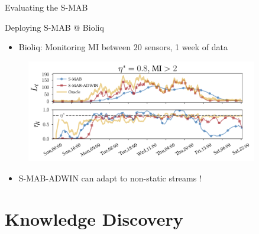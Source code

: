 \documentclass[16pt,usenames,dvipsnames, notheorems]{beamer}
\theoremstyle{definition}
\theoremstyle{example}
\theoremstyle{plain}
\begin{document}
\begin{frame}{Evaluating the S-MAB}
~\\

\end{frame}

\begin{frame}{Deploying S-MAB @ Bioliq}

\begin{itemize}
	\item Bioliq: Monitoring MI between $20$ sensors, 1 week of data
\end{itemize}
\begin{figure}
	\includegraphics[width=0.9\textwidth]{figures/Lt_etat_reduced_defense-compressed.pdf}
\end{figure}
\vspace{-0.5cm}
\begin{itemize}
	\item S-MAB-ADWIN can adapt to non-static streams ! 
\end{itemize}
\end{frame}

\section{Knowledge Discovery}
\end{document}
